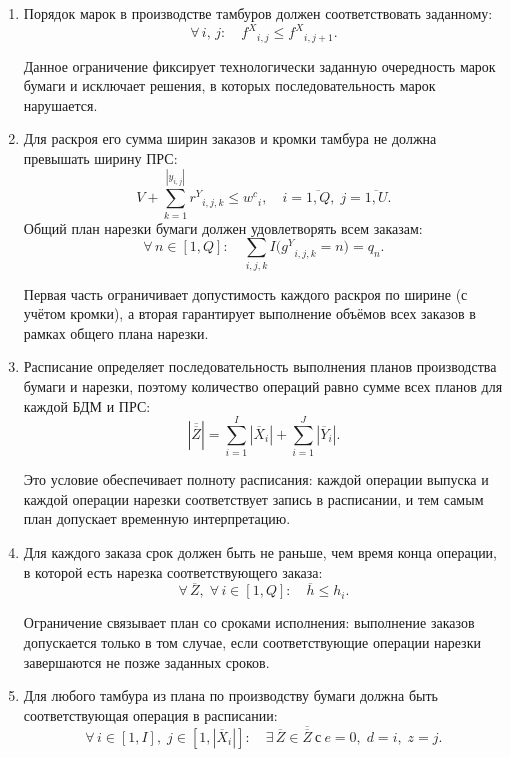 \begin{enumerate}
     \item Порядок марок в производстве тамбуров должен соответствовать заданному:
     \[
     \forall\, i,\,j:\quad {{f^X}}_{i,j} \leq {{f^X}}_{i,j + 1}.
    \]

    Данное ограничение фиксирует технологически заданную очередность марок бумаги и исключает решения, в которых последовательность марок нарушается.

    \item Для раскроя его сумма ширин заказов и кромки тамбура не должна превышать ширину ПРС:
    \[
    V + \sum_{k = 1}^{\left| y_{i,j} \right|}{r^Y}_{i,j,k} \leq {w^c}_{i},\quad i=\overline{1,Q},\; j=\overline{1,U}.
    \]
Общий план нарезки бумаги должен удовлетворять всем заказам:
    \[
    \forall\, n \in [1,Q]:\quad \sum_{i,j,k} I\bigl( {{g^Y}}_{i,j,k} = n \bigr) = q_{n}.
    \]

    Первая часть ограничивает допустимость каждого раскроя по ширине (с учётом кромки), а вторая гарантирует выполнение объёмов всех заказов в рамках общего плана нарезки.

    \item Расписание определяет последовательность выполнения планов производства бумаги и нарезки, поэтому количество операций равно сумме всех планов для каждой БДМ и ПРС:
    \[
    \left| \overline{\overline{Z}} \right| = \sum_{i = 1}^{I}\left| {\overline{X}}_{i} \right| + \sum_{i = 1}^{J}\left| {\overline{Y}}_{i} \right|.
    \]

    Это условие обеспечивает полноту расписания: каждой операции выпуска и каждой операции нарезки соответствует запись в расписании, и тем самым план допускает временную интерпретацию.

    \item Для каждого заказа срок должен быть не раньше, чем время конца операции, в которой есть нарезка соответствующего заказа:
    \[
    \forall\,\overline{Z},\;\forall\, i \in [1,Q]:\quad \overline{h} \leq h_{i}.
    \]

    Ограничение связывает план со сроками исполнения: выполнение заказов допускается только в том случае, если соответствующие операции нарезки завершаются не позже заданных сроков.

    \item Для любого тамбура из плана по производству бумаги должна быть соответствующая операция в расписании:
    \[
    \forall\, i \in [1, I],\; j \in [1,|{\overline{X}}_{i}|]:\quad \exists\,\overline{Z} \in \overline{\overline{Z}}\ \text{с} \ e = 0,\; d = i,\; z = j.
    \]


\end{enumerate}
